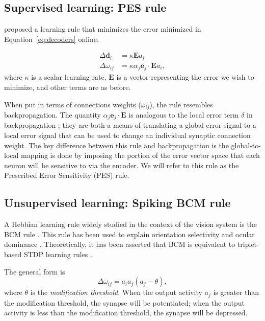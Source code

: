 \documentclass[10pt,letterpaper]{article}
\begin{document}
\subsection{Supervised learning: PES rule}

 proposed a learning rule
that minimizes the error minimized
in Equation~\eqref{eq:decoders} online.

\begin{align} \label{eq:pes}
  \Delta \mathbf{d}_i &= \kappa \mathbf{E} a_i \nonumber \\
  \Delta \omega_{ij} &= \kappa \alpha_j \mathbf{e}_j \cdot \mathbf{E} a_i,
\end{align}
where $\kappa$ is a scalar learning rate,
$\mathbf{E}$ is a vector representing the error we wish to minimize,
and other terms are as before.

When put in terms of connections weights ($\omega_{ij}$),
the rule resembles backpropagation.
The quantity $\alpha_j \mathbf{e}_j \cdot \mathbf{E}$
is analogous to the local error term
$\delta$ in backpropagation \cite{Rumelhart1986};
they are both a means of translating a global error signal
to a local error signal that can be used to
change an individual synaptic connection weight.
The key difference between this rule
and backpropagation is the global-to-local mapping
is done by imposing the portion of the error vector space
that each neuron will be sensitive to via the encoder.
We will refer to this rule as
the Prescribed Error Sensitivity (PES) rule.

\subsection{Unsupervised learning: Spiking BCM rule}

A Hebbian learning rule widely studied
in the context of the vision system
is the BCM rule \cite{Bienenstock1982}.
This rule has been used to explain orientation selectivity
and ocular dominance \cite{Bienenstock1982}.
Theoretically, it has been asserted that BCM is equivalent
to triplet-based STDP learning rules \cite{Pfister2006}.

The general form is
\begin{equation} \label{eq:orig-bcm}
  \Delta \omega_{ij} = a_i a_j (a_j - \theta),
\end{equation}
where $\theta$ is the \textit{modification threshold}.
When the output activity $a_j$ is
greater than the modification threshold,
the synapse will be potentiated;
when the output activity is less than the modification threshold,
the synapse will be depressed.
\end{document}

